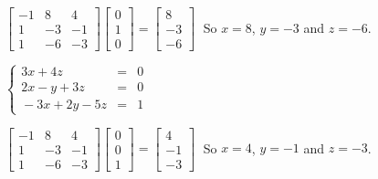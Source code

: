 \documentclass{ximera}
\begin{document}
\begin{question}
\begin{problem}
\begin{solution}
$\left[ \begin{array}{rrr} -1 & 8 & 4 \\ 1 & -3 & -1 \\ 1 & -6 & -3 \end{array} \right] \left[ \begin{array}{r} 0 \\ 1 \\ 0 \end{array} \right] = \left[ \begin{array}{r} 8 \\ -3 \\ -6 \end{array} \right] \;$ So $x = 8$, $y = -3$ and $z = -6$.
\end{solution}
\end{problem}

\begin{problem}\label{3by3inverselast}
$\left\{ \begin{array}{rcr}   3x + 4z & = & 0 \\ 2x - y + 3z & = & 0 \\ \!-3x + 2y - 5z & = & 1  \end{array} \right.$

\begin{solution}
$\left[ \begin{array}{rrr} -1 & 8 & 4 \\ 1 & -3 & -1 \\ 1 & -6 & -3 \end{array} \right] \left[ \begin{array}{r} 0 \\ 0 \\ 1 \end{array} \right] = \left[ \begin{array}{r} 4 \\ -1 \\ -3 \end{array} \right] \;$ So $x = 4$, $y = -1$ and $z = -3$.
\end{solution}
\end{problem}

\end{question}
\end{document}
